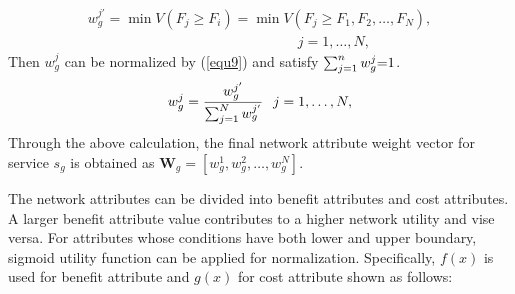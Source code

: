 \documentclass[conference]{IEEEtran}
\begin{document}
\begin{equation}   
\label{equ8}
\begin{array}{l}
{w_{g}^{j'}} = \min V({F_j} \ge {F_i}) = \min V({F_j} \ge {F_1},{F_2}, \ldots ,{F_N}),\\
\;\;\;\;\;\;\;\;\;\;\;\;\;\;\;\;\;\;\;\;\;\;\;\;\;\;\;\;\;\;\;\;\;\;\;\;\;\;\;\;\;\;\;\;\;\;\;\;\;\;\;\;\;\;j = 1, \ldots ,N  ,
\end{array} 
\end{equation}  
Then $w^j_g$ can be normalized by (\ref{equ9}) and satisfy $\sum\nolimits_{j = 1}^n {w_{g}^{j}} {\rm{ = }}1$.  
\begin{equation}   
\label{equ9}
w^j_{g} = \frac{{w_{g}^{j'}}}{{\sum\nolimits_{j = 1}^N {w_{g}^{j'}} }}{\kern 1pt} {\kern 1pt} {\kern 1pt} {\kern 1pt} {\kern 1pt} {\kern 1pt} {\kern 1pt} j = 1, \ldots ,N,
\end{equation} 
Through the above calculation, the final network attribute weight vector for service $s_g$ is obtained as $\boldsymbol{W}_g = [w_g^1,w_g^2, \ldots ,w_g^N]$.

The network attributes can be divided into benefit attributes and cost attributes. A larger benefit attribute value contributes to a higher network utility and vise versa. 
For attributes whose conditions have both lower and upper boundary, sigmoid utility function can be applied for normalization. 
Specifically, $f(x)$ is used for benefit attribute and $g(x)$ for cost attribute shown as follows:
\end{document}
